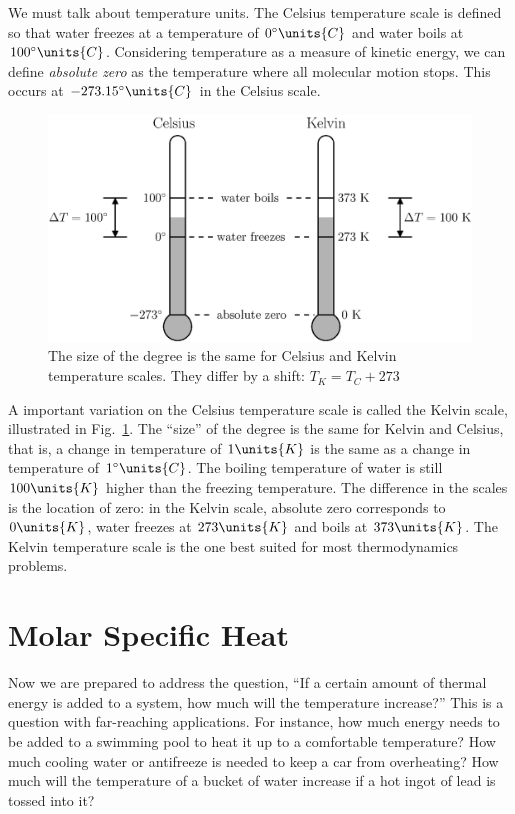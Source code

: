 We must talk about temperature units.  The Celsius
temperature scale is defined so that water freezes at a temperature of
$0^\circ\units{C}$ and water boils at $100^\circ\units{C}$.  Considering
temperature as a measure of kinetic energy, we can define {\em absolute
zero} as the temperature where all molecular motion stops.  This occurs at
$-273.15^\circ\units{C}$ in the Celsius scale.  

\begin{figure}
\begin{center}
\includegraphics[width=4.5in]{thermal_energy_and_solids/temperature_scales}
\caption{The size of the degree is the same for Celsius and Kelvin
  temperature scales.  They differ by a shift:  $T_K=T_C+273$}
\label{fig:temperature_scales}
\end{center}
\end{figure}

A important variation on the Celsius temperature scale is called the
Kelvin scale, illustrated in Fig.~\ref{fig:temperature_scales}.  The
``size'' of the degree is the same for Kelvin and Celsius, that is, a
change in temperature of $1\units{K}$ is the same as a change in
temperature of $1^\circ\units{C}$.  The boiling temperature of water
is still $100\units{K}$ higher than the freezing temperature. The
difference in the scales is the location of zero: in the Kelvin scale,
absolute zero corresponds to $0\units{K}$, water freezes at
$273\units{K}$ and boils at $373\units{K}$.  The Kelvin temperature
scale is the one best suited for most thermodynamics problems.


\section{Molar Specific Heat}

Now we are prepared to address the question, ``If a certain amount of
thermal energy is added to a system, how much will the temperature
increase?''  This is a question with far-reaching applications.  For
instance, how much energy needs to be added to a swimming pool to heat
it up to a comfortable temperature?  How much cooling water or antifreeze
is needed to keep a car from overheating?  How much will the temperature
of a bucket of water increase if a hot ingot of lead is tossed into it?

